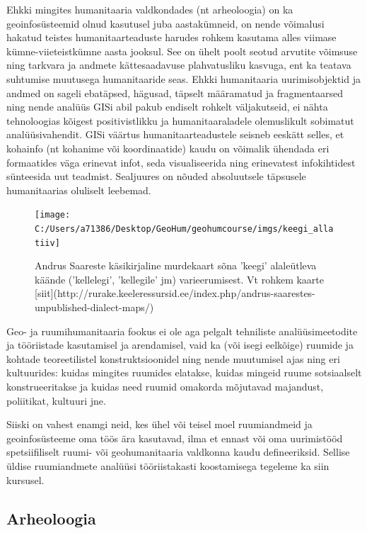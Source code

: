\documentclass[
]{book}
\begin{document}
Ehkki mingites humanitaaria valdkondades (nt arheoloogia) on ka geoinfosüsteemid olnud kasutusel juba aastakümneid, on nende võimalusi hakatud teistes humanitaarteaduste harudes rohkem kasutama alles viimase kümne-viieteistkümne aasta jooksul. See on ühelt poolt seotud arvutite võimsuse ning tarkvara ja andmete kättesaadavuse plahvatusliku kasvuga, ent ka teatava suhtumise muutusega humanitaaride seas. Ehkki humanitaaria uurimisobjektid ja andmed on sageli ebatäpsed, hägusad, täpselt määramatud ja fragmentaarsed ning nende analüüs GISi abil pakub endiselt rohkelt väljakutseid, ei nähta tehnoloogias kõigest positivistlikku ja humanitaaraladele olemuslikult sobimatut analüüsivahendit. GISi väärtus humanitaarteadustele seisneb eeskätt selles, et kohainfo (nt kohanime või koordinaatide) kaudu on võimalik ühendada eri formaatides väga erinevat infot, seda visualiseerida ning erinevatest infokihtidest sünteesida uut teadmist. Sealjuures on nõuded absoluutsele täpsusele humanitaarias oluliselt leebemad.

\begin{figure}

{\centering \texttt{[image: C:/Users/a71386/Desktop/GeoHum/geohumcourse/imgs/keegi\_allatiiv]} 

}

\caption{Andrus Saareste käsikirjaline murdekaart sõna 'keegi' alaleütleva käände ('kellelegi', 'kellegile' jm) varieerumisest. Vt rohkem kaarte [siit](http://rurake.keeleressursid.ee/index.php/andrus-saarestes-unpublished-dialect-maps/)}\label{fig:murdekaart}
\end{figure}

Geo- ja ruumihumanitaaria fookus ei ole aga pelgalt tehniliste analüüsimeetodite ja tööriistade kasutamisel ja arendamisel, vaid ka (või isegi eelkõige) ruumide ja kohtade teoreetilistel konstruktsioonidel ning nende muutumisel ajas ning eri kultuurides: kuidas mingites ruumides elatakse, kuidas mingeid ruume sotsiaalselt konstrueeritakse ja kuidas need ruumid omakorda mõjutavad majandust, poliitikat, kultuuri jne.

Siiski on vahest enamgi neid, kes ühel või teisel moel ruumiandmeid ja geoinfosüsteeme oma töös ära kasutavad, ilma et ennast või oma uurimistööd spetsiifiliselt ruumi- või geohumanitaaria valdkonna kaudu defineeriksid. Sellise üldise ruumiandmete analüüsi tööriistakasti koostamisega tegeleme ka siin kursusel.

\hypertarget{arheoloogia}{%
\subsection{Arheoloogia}\label{arheoloogia}}
\end{document}

